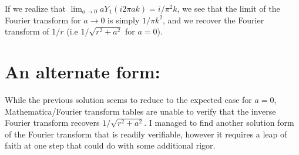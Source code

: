 \documentclass[letterpaper,10pt]{article}
\begin{document}
If we realize that $\lim_{a \to 0} a Y_1(i 2 \pi a k) = i/\pi^2 k$, we see that the limit of the Fourier transform for $a \to 0$ is simply $1/\pi k^2$, and we recover the Fourier transform of $1/r$ (i.e $1/\sqrt{r^2 + a^2}$ for $a=0$).

\vskip 0.1in
\section*{An alternate form:}
While the previous solution seems to reduce to the expected case for $a=0$, Mathematica/Fourier transform tables are unable to verify that the inverse Fourier transform recovers $1/\sqrt{r^2 + a^2}$. I managed to find another solution form of the Fourier transform that is readily verifiable, however it requires a leap of faith at one step that could do with some additional rigor.
\end{document}
